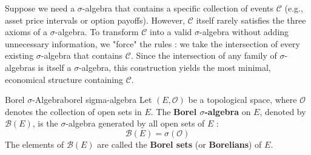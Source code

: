 
\begin{insight}
Suppose we need a $\sigma$-algebra that contains a specific collection of events $\mathcal{C}$ (e.g., asset price intervals or option payoffs). However, $\mathcal{C}$ itself rarely satisfies the three axioms of a $\sigma$-algebra.\vspace{1em} 
To transform $\mathcal{C}$ into a valid $\sigma$-algebra without adding unnecessary information, we "force" the rules : we take the intersection of every existing $\sigma$-algebra that contains $\mathcal{C}$. Since the intersection of any family of $\sigma$-algebras is itself a $\sigma$-algebra, this construction yields the most minimal, economical structure containing $\mathcal{C}$.
\end{insight}

\vspace{0em}


\begin{definition}{Borel $\sigma$-Algebra}{borel sigma-algebra}
Let $(E, \mathcal{O})$ be a topological space, where $\mathcal{O}$ denotes the collection of open sets in $E$. The \textbf{Borel $\sigma$-algebra} on $E$, denoted by $\mathcal{B}(E)$, is the $\sigma$-algebra generated by all open sets of $E$ :
\[
    \mathcal{B}(E) = \sigma(\mathcal{O})
\]
The elements of $\mathcal{B}(E)$ are called the \textbf{Borel sets} (or \textbf{Borelians}) of $E$.
\end{definition}


